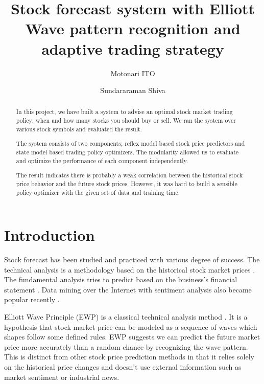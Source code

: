 \documentclass[twocolumn,10pt]{asme2ej}
\begin{document}
\title{Stock forecast system with Elliott Wave pattern recognition and adaptive trading strategy}
\author{Motonari ITO
}

\author{Sundararaman Shiva
}

\maketitle

\begin{abstract}
  In this project, we have built a system to advise an optimal stock market
  trading policy; when and how many stocks you should buy or sell. We ran the
  system over various stock symbols and evaluated the result.

  The system consists of two components; reflex model based stock price
  predictors and state model based trading policy optimizers. The
  modularity allowed us to evaluate and optimize the performance of each
  component independently.
  
  The result indicates there is probably a weak correlation between the
  historical stock price behavior and the future stock prices. However, it was
  hard to build a sensible policy optimizer with the given set of data and
  training time.
\end{abstract}

\section{Introduction}

Stock forecast has been studied and practiced with various degree of
success. The technical analysis is a methodology based on the
historical stock market prices \cite{wiki:technical_analysis}. The
fundamental analysis tries to predict based on the business's
financial statement \cite{wiki:fundamental_analysis}. Data mining over
the Internet with sentiment analysis also became popular recently
\cite{web:data_mining_analysis}.

Elliott Wave Principle (EWP) is a classical technical analysis method
\cite{frost1981elliott, web:study_of_cycles}. It is a hypothesis that stock
market price can be modeled as a sequence of waves which shapes follow some
defined rules. EWP suggests we can predict the future market price more
accurately than a random chance by recognizing the wave pattern.  This is
distinct from other stock price prediction methods in that it relies solely on
the historical price changes and doesn't use external information such as market
sentiment or industrial news.
\end{document}
